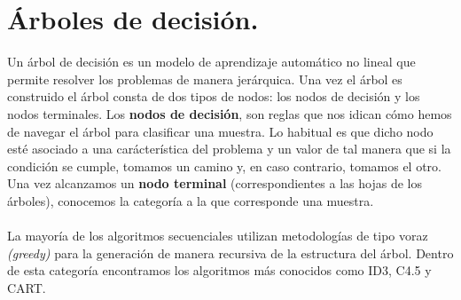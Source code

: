 \chapter{Árboles de decisión.}

Un árbol de decisión es un modelo de aprendizaje automático no lineal que permite resolver los problemas de manera jerárquica. Una vez el árbol es construido el árbol consta de dos tipos de nodos: los nodos de decisión y los nodos terminales. Los \textbf{nodos de decisión}, son reglas que nos idican cómo hemos de navegar el árbol para clasificar una muestra. Lo habitual es que dicho nodo esté asociado a una carácterística del problema y un valor de tal manera que si la condición se cumple, tomamos un camino y, en caso contrario, tomamos el otro. Una vez alcanzamos un \textbf{nodo terminal} (correspondientes a las hojas de los árboles), conocemos la categoría a la que corresponde una muestra.\\\\

La mayoría de los algoritmos secuenciales utilizan metodologías de tipo voraz \textit{(greedy)} para la generación de manera recursiva de la estructura del árbol. Dentro de esta categoría encontramos los algoritmos más conocidos como ID3, C4.5 y CART.
